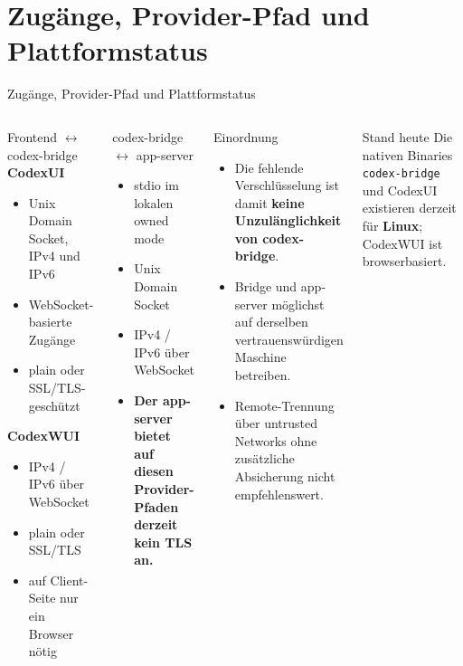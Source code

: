 \documentclass[\fhformat,10pt]{fh-ooe}
\begin{document}
\section{Zugänge, Provider-Pfad und Plattformstatus}
\begin{frame}{Zugänge, Provider-Pfad und Plattformstatus}
\footnotesize
\begin{columns}[T]
\begin{block}{Frontend $\leftrightarrow$ codex-bridge}
\textbf{CodexUI}
\begin{itemize}
  \item Unix Domain Socket, IPv4 und IPv6
  \item WebSocket-basierte Zugänge
  \item plain oder SSL/TLS-geschützt
\end{itemize}
\textbf{CodexWUI}
\begin{itemize}
  \item IPv4 / IPv6 über WebSocket
  \item plain oder SSL/TLS
  \item auf Client-Seite nur ein Browser nötig
\end{itemize}
\end{block}
\begin{block}{codex-bridge $\leftrightarrow$ app-server}
\begin{itemize}
  \item stdio im lokalen owned mode
  \item Unix Domain Socket
  \item IPv4 / IPv6 über WebSocket
  \item \textbf{Der app-server bietet auf diesen Provider-Pfaden derzeit kein TLS an.}
\end{itemize}
\end{block}
\begin{alertblock}{Einordnung}
\begin{itemize}
  \item Die fehlende Verschlüsselung ist damit \textbf{keine Unzulänglichkeit von codex-bridge}.
  \item Bridge und app-server möglichst auf derselben vertrauenswürdigen Maschine betreiben.
  \item Remote-Trennung über untrusted Networks ohne zusätzliche Absicherung nicht empfehlenswert.
\end{itemize}
\end{alertblock}
\begin{block}{Stand heute}
Die nativen Binaries \texttt{codex-bridge} und CodexUI existieren derzeit für \textbf{Linux}; CodexWUI ist browserbasiert.
\end{block}
\end{columns}
\end{frame}
\end{document}
